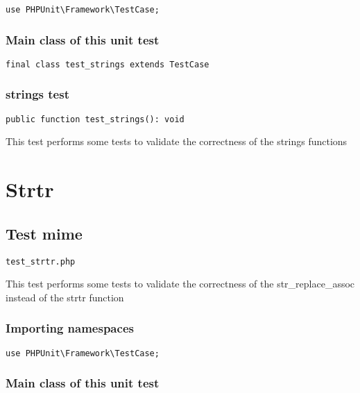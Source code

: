 \documentclass[a4paper]{article}
\begin{document}
\begin{lstlisting}
use PHPUnit\Framework\TestCase;
\end{lstlisting}

\hypertarget{toc376}{}
\subsubsection{Main class of this unit test}

\begin{lstlisting}
final class test_strings extends TestCase
\end{lstlisting}

\hypertarget{toc377}{}
\subsubsection{strings test}

\begin{lstlisting}
public function test_strings(): void
\end{lstlisting}

This test performs some tests to validate the correctness
of the strings functions


\hypertarget{toc378}{}
\section{Strtr}

\hypertarget{toc379}{}
\subsection{Test mime}

\begin{lstlisting}
test_strtr.php
\end{lstlisting}

This test performs some tests to validate the correctness
of the str\_replace\_assoc instead of the strtr function

\hypertarget{toc380}{}
\subsubsection{Importing namespaces}

\begin{lstlisting}
use PHPUnit\Framework\TestCase;
\end{lstlisting}

\hypertarget{toc381}{}
\subsubsection{Main class of this unit test}
\end{document}
